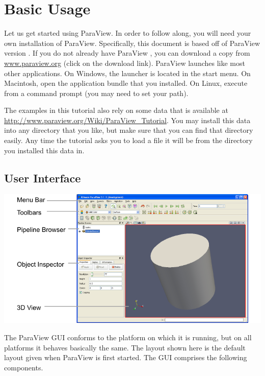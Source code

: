 \chapter{Basic Usage}
\label{chap:BasicUsage}

Let us get started using ParaView.  In order to follow along, you will need
your own installation of ParaView.  Specifically, this document is based
off of ParaView version \pvversion.  If you do not already have ParaView
\pvversion, you can download a copy from
\href{http://www.paraview.org}{www.paraview.org} (click on the download
link).  ParaView launches like most other applications.  On Windows, the
launcher is located in the start menu.  On Macintosh, open the application
bundle that you installed.  On Linux, execute  from a
command prompt (you may need to set your path).

The examples in this tutorial also rely on some data that is available at
\href{http://www.paraview.org/Wiki/ParaView_Tutorial}{http://www.paraview.org/Wiki/ParaView\_Tutorial}.
You may install this data into any directory that you like, but make sure
that you can find that directory easily.  Any time the tutorial asks you to
load a file it will be from the directory you installed this data in.


\section{User Interface}

\begin{inlinefig}
  \includegraphics[scale=\bbscale]{images/UserInterface}
\end{inlinefig}

The ParaView GUI conforms to the platform on which it is running, but on
all platforms it behaves basically the same.  The layout shown here is the
default layout given when ParaView is first started.  The GUI comprises the
following components.


